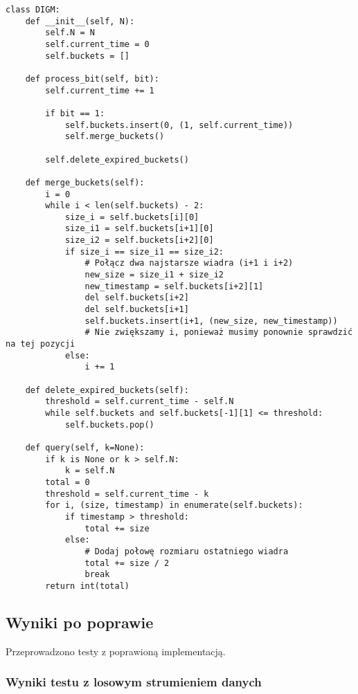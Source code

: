 \documentclass{article}
\begin{document}
\begin{lstlisting}[style=pystyle, caption=Poprawiona implementacja algorytmu DGIM]
class DIGM:
    def __init__(self, N):
        self.N = N
        self.current_time = 0
        self.buckets = []

    def process_bit(self, bit):
        self.current_time += 1

        if bit == 1:
            self.buckets.insert(0, (1, self.current_time))
            self.merge_buckets()

        self.delete_expired_buckets()

    def merge_buckets(self):
        i = 0
        while i < len(self.buckets) - 2:
            size_i = self.buckets[i][0]
            size_i1 = self.buckets[i+1][0]
            size_i2 = self.buckets[i+2][0]
            if size_i == size_i1 == size_i2:
                # Połącz dwa najstarsze wiadra (i+1 i i+2)
                new_size = size_i1 + size_i2
                new_timestamp = self.buckets[i+2][1]
                del self.buckets[i+2]
                del self.buckets[i+1]
                self.buckets.insert(i+1, (new_size, new_timestamp))
                # Nie zwiększamy i, ponieważ musimy ponownie sprawdzić na tej pozycji
            else:
                i += 1

    def delete_expired_buckets(self):
        threshold = self.current_time - self.N
        while self.buckets and self.buckets[-1][1] <= threshold:
            self.buckets.pop()

    def query(self, k=None):
        if k is None or k > self.N:
            k = self.N
        total = 0
        threshold = self.current_time - k
        for i, (size, timestamp) in enumerate(self.buckets):
            if timestamp > threshold:
                total += size
            else:
                # Dodaj połowę rozmiaru ostatniego wiadra
                total += size / 2
                break
        return int(total)
\end{lstlisting}

\subsection{Wyniki po poprawie}

Przeprowadzono testy z poprawioną implementacją.

\subsubsection{Wyniki testu z losowym strumieniem danych}
\end{document}
